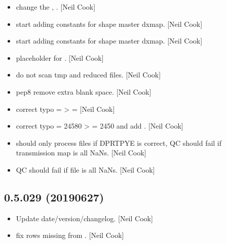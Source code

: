 \documentclass[a4paper,10pt,english]{report}
\begin{document}
\begin{itemize}
\item {} 
 \sphinxhyphen{} change the ,
. {[}Neil Cook{]}

\item {} 
 \sphinxhyphen{} start adding constants for shape master
dxmap. {[}Neil Cook{]}

\item {} 
 \sphinxhyphen{} start adding constants for shape master dxmap.
{[}Neil Cook{]}

\item {} 
 \sphinxhyphen{} placeholder for . {[}Neil
Cook{]}

\item {} 
 \sphinxhyphen{} do not scan tmp and reduced files. {[}Neil Cook{]}

\item {} 
 \sphinxhyphen{} pep8 \sphinxhyphen{} remove extra blank space. {[}Neil Cook{]}

\item {} 
 \sphinxhyphen{} correct typo  = 
\textendash{}\textgreater{}  =  {[}Neil Cook{]}

\item {} 
 \sphinxhyphen{} correct typo  = 24580 \textendash{}\textgreater{}
 = 2450 and add . {[}Neil
Cook{]}

\item {} 
  \sphinxhyphen{} should only process files if
DPRTPYE is correct, QC should fail if transmission map is all NaNs.
{[}Neil Cook{]}

\item {} 
 \sphinxhyphen{} QC should fail if file is all NaNs. {[}Neil
Cook{]}

\end{itemize}


\subsection{0.5.029 (2019\sphinxhyphen{}06\sphinxhyphen{}27)}
\label{\detokenize{misc/changelog:id127}}\begin{itemize}
\item {} 
Update date/version/changelog. {[}Neil Cook{]}

\item {} 
 \sphinxhyphen{} fix rows missing from . {[}Neil Cook{]}

\end{itemize}
\end{document}
